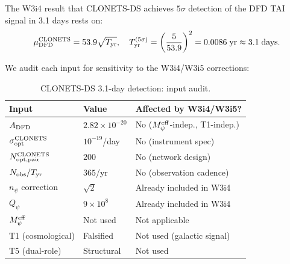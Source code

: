 \documentclass[aps,prd,twocolumn,superscriptaddress,nofootinbib]{revtex4-2}
\newcommand{\Qpsi}{Q_\psi}
\newcommand{\npsi}{n_\psi}
\newcommand{\Meff}{M_\psi^{\rm eff}}
\newcommand{\ee}[1]{\times 10^{#1}}
\begin{document}
The W3i4 result that CLONETS-DS achieves $5\sigma$ detection of the
DFD TAI signal in 3.1 days rests on:
\begin{equation}
\mu_{\rm DFD}^{\rm CLONETS} = 53.9\sqrt{T_{\rm yr}},
\quad T_{\rm yr}^{(5\sigma)} = \left(\frac{5}{53.9}\right)^2
= 0.0086\;\text{yr} \approx 3.1\;\text{days}.
\label{eq:CLONETS}
\end{equation}

We audit each input for sensitivity to the W3i4/W3i5 corrections:

\begin{table}[h]
\centering
\caption{CLONETS-DS 3.1-day detection: input audit.}
\label{tab:CLONETS_audit}
\begin{tabular}{p{3.5cm}p{1.5cm}p{2.5cm}}
\toprule
Input & Value & Affected by W3i4/W3i5? \\
\midrule
$A_{\rm DFD}$ & $2.82\ee{-20}$ & No ($\Meff$-indep., T1-indep.) \\
$\sigma_{\rm opt}^{\rm CLONETS}$ & $10^{-19}$/day & No (instrument spec) \\
$N_{\rm opt,pair}^{\rm CLONETS}$ & $200$ & No (network design) \\
$N_{\rm obs}/T_{\rm yr}$ & $365$/yr & No (observation cadence) \\
$\npsi$ correction & $\sqrt{2}$ & Already included in W3i4 \\
$\Qpsi$ & $9\ee{8}$ & Already included in W3i4 \\
$\Meff$ & Not used & Not applicable \\
T1 (cosmological) & Falsified & Not used (galactic signal) \\
T5 (dual-role) & Structural & Not used \\
\bottomrule
\end{tabular}
\end{table}
\end{document}
